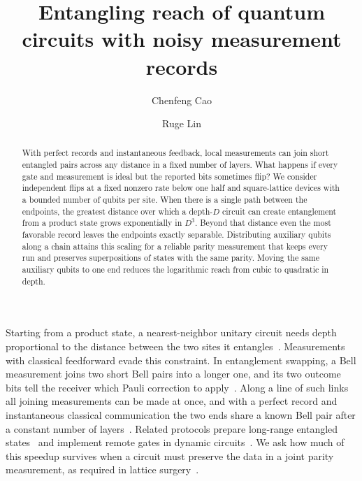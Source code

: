 \documentclass[aps,prl,twocolumn,superscriptaddress,longbibliography,reprint,floatfix]{revtex4-2}
\begin{document}
\title{Entangling reach of quantum circuits with noisy measurement records}
\author{Chenfeng Cao}


\author{Ruge Lin}

\begin{abstract}
With perfect records and instantaneous feedback, local measurements can join short entangled pairs across any distance in a fixed number of layers. What happens if every gate and measurement is ideal but the reported bits sometimes flip? We consider independent flips at a fixed nonzero rate below one half and square-lattice devices with a bounded number of qubits per site. When there is a single path between the endpoints, the greatest distance over which a depth-$D$ circuit can create entanglement from a product state grows exponentially in $D^3$. Beyond that distance even the most favorable record leaves the endpoints exactly separable. Distributing auxiliary qubits along a chain attains this scaling for a reliable parity measurement that keeps every run and preserves superpositions of states with the same parity. Moving the same auxiliary qubits to one end reduces the logarithmic reach from cubic to quadratic in depth.
\end{abstract}
\maketitle

Starting from a product state, a nearest-neighbor unitary circuit needs depth proportional to the distance between the two sites it entangles~\cite{Lieb1972,BHV2006}. Measurements with classical feedforward evade this constraint. In entanglement swapping, a Bell measurement joins two short Bell pairs into a longer one, and its two outcome bits tell the receiver which Pauli correction to apply~\cite{Bennett1993,Zukowski1993,Hermans2022}. Along a line of such links all joining measurements can be made at once, and with a perfect record and instantaneous classical communication the two ends share a known Bell pair after a constant number of layers~\cite{Piroli2021,Lu2022,Baumer2024,CaoEisert2026}. Related protocols prepare long-range entangled states~\cite{Tantivasadakarn2024,FossFeig2023} and implement remote gates in dynamic circuits~\cite{Baumer2024}. We ask how much of this speedup survives when a circuit must preserve the data in a joint parity measurement, as required in lattice surgery~\cite{Horsman2012,Chamberland2022}.
\end{document}
